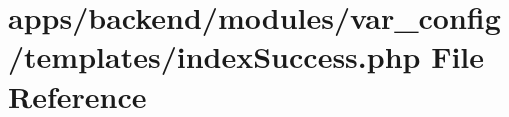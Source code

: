 \hypertarget{backend_2modules_2var__config_2templates_2index_success_8php}{\section{apps/backend/modules/var\-\_\-config/templates/index\-Success.php File Reference}
\label{backend_2modules_2var__config_2templates_2index_success_8php}
}
